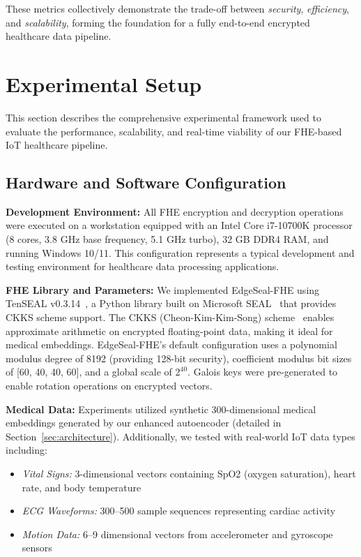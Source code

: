 \documentclass[review]{elsarticle}
\begin{document}
These metrics collectively demonstrate the trade-off between \textit{security}, \textit{efficiency}, and \textit{scalability}, forming the foundation for a fully end-to-end encrypted healthcare data pipeline.

\section{Experimental Setup}
\label{sec:experimental-setup}

This section describes the comprehensive experimental framework used to evaluate the performance, scalability, and real-time viability of our FHE-based IoT healthcare pipeline.

\subsection{Hardware and Software Configuration}

\textbf{Development Environment:} All FHE encryption and decryption operations were executed on a workstation equipped with an Intel Core i7-10700K processor (8 cores, 3.8 GHz base frequency, 5.1 GHz turbo), 32 GB DDR4 RAM, and running Windows 10/11. This configuration represents a typical development and testing environment for healthcare data processing applications.

\textbf{FHE Library and Parameters:} We implemented EdgeSeal-FHE using TenSEAL v0.3.14~\cite{benaissa2021tenseal}, a Python library built on Microsoft SEAL~\cite{sealcrypto} that provides CKKS scheme support. The CKKS (Cheon-Kim-Kim-Song) scheme~\cite{cheon2017homomorphic} enables approximate arithmetic on encrypted floating-point data, making it ideal for medical embeddings. EdgeSeal-FHE's default configuration uses a polynomial modulus degree of 8192 (providing 128-bit security), coefficient modulus bit sizes of [60, 40, 40, 60], and a global scale of $2^{40}$. Galois keys were pre-generated to enable rotation operations on encrypted vectors.

\textbf{Medical Data:} Experiments utilized synthetic 300-dimensional medical embeddings generated by our enhanced autoencoder (detailed in Section~\ref{sec:architecture}). Additionally, we tested with real-world IoT data types including:
\begin{itemize}
    \item \textit{Vital Signs:} 3-dimensional vectors containing SpO2 (oxygen saturation), heart rate, and body temperature
    \item \textit{ECG Waveforms:} 300--500 sample sequences representing cardiac activity
    \item \textit{Motion Data:} 6--9 dimensional vectors from accelerometer and gyroscope sensors
\end{itemize}
\end{document}

